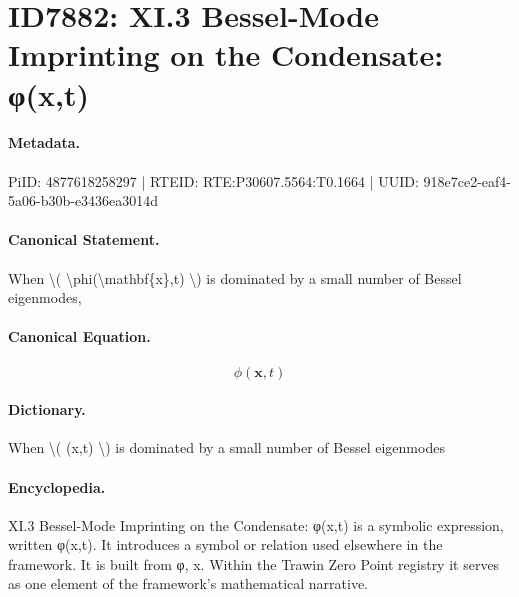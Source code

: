 \section*{ID7882: XI.3 Bessel-Mode Imprinting on the Condensate: φ(x,t)}
\paragraph{Metadata.}
PiID: 4877618258297 | RTEID: RTE:P30607.5564:T0.1664 | UUID: 918e7ce2-eaf4-5a06-b30b-e3436ea3014d

\paragraph{Canonical Statement.}
When \textbackslash{}( \textbackslash{}phi(\textbackslash{}mathbf\{x\},t) \textbackslash{}) is dominated by a small number of Bessel eigenmodes,

\paragraph{Canonical Equation.}
\[
\phi(\mathbf{x},t)
\]

\paragraph{Dictionary.}
When \textbackslash{}( (x,t) \textbackslash{}) is dominated by a small number of Bessel eigenmodes

\paragraph{Encyclopedia.}
XI.3 Bessel-Mode Imprinting on the Condensate: φ(x,t) is a symbolic expression, written φ(x,t). It introduces a symbol or relation used elsewhere in the framework. It is built from φ, x. Within the Trawin Zero Point registry it serves as one element of the framework's mathematical narrative.
